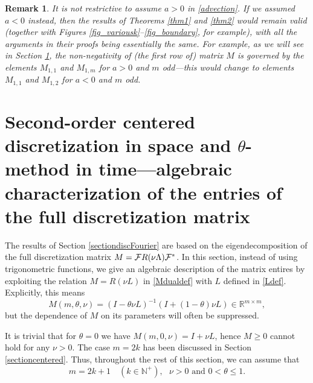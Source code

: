 \documentclass[a4paper]{article}
\newtheorem{remark}{Remark}
\newcommand{\te}{\theta}
\newcommand{\nplus}{\mathbb{N}^+}
\newcommand{\cF}{{\cal{F}}}
\begin{document}
\begin{remark}
It is not restrictive to assume $a>0$ in \eqref{advection}. If we assumed $a<0$ instead, then the results of Theorems \ref{thm1} and \ref{thm2} would remain valid (together with Figures \ref{fig_variousk}--\ref{fig_boundary}, for example), with all the arguments in their proofs being essentially the same.  For example, as we will see in Section \ref{section3}, the non-negativity of (the first row of) matrix $M$ is governed by the elements $M_{1,1}$ and $M_{1,m}$ for $a>0$ and $m$ odd---this would change to elements $M_{1,1}$ and $M_{1,2}$ for $a<0$ and $m$ odd.
\end{remark}






\section{Second-order centered discretization in space and $\theta$-method in time---algebraic characterization of the entries of the full discretization matrix}\label{section3}

The results of Section \ref{sectiondiscFourier} are based on the eigendecomposition of the full discretization matrix $M=\cF R(\nu \Lambda) \cF^*$. In this section, instead of using trigonometric functions, we give an algebraic description of the matrix entires by exploiting the relation $M=R(\nu L)$ in \eqref{Mdualdef} with $L$ defined in \eqref{Ldef}.
Explicitly, this means 
\begin{equation}\label{Mdef}
M(m,\te,\nu)=(I-\te\nu L)^{-1}(I+(1-\te)\nu L)\in\mathbb{R}^{m\times m},
\end{equation}
but the dependence of $M$ on its parameters will often be suppressed. 

It is trivial that for $\te=0$ we have $M(m,0,\nu)=I+\nu L$, hence $M\ge 0$ cannot hold for any $\nu>0$. The case $m=2k$ has been discussed in Section \ref{sectioncentered}. Thus, throughout the rest of this section, we can assume that 
\begin{equation}\label{genassump}
\boxed{ 
m=2k+1\quad (k\in\nplus), \ \ \ \nu>0 \text{\ \  and\ \  } 0<\te\le 1.}
\end{equation}
\end{document}
